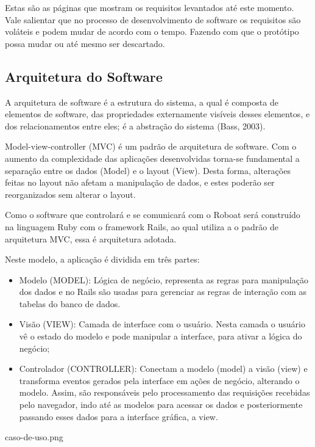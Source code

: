Estas são as páginas que mostram os requisitos levantados até este momento. Vale salientar que no processo de desenvolvimento de software os requisitos são voláteis e podem mudar de acordo com o tempo. Fazendo com que o protótipo possa mudar ou até mesmo ser descartado.

\subsection{Arquitetura do Software}


A arquitetura de software é a estrutura do sistema, a qual é composta de elementos de software, das propriedades externamente visíveis desses elementos, e dos relacionamentos entre eles; é a abstração do sistema (Bass, 2003).

Model-view-controller (MVC) é um padrão de arquitetura de software. Com o aumento da complexidade das aplicações desenvolvidas torna-se fundamental a separação entre os dados (Model) e o layout (View). Desta forma, alterações feitas no layout não afetam a manipulação de dados, e estes poderão ser reorganizados sem alterar o layout. 

Como o software que controlará e se comunicará com o Roboat será construído na linguagem Ruby com o framework Rails, ao qual utiliza a o padrão de arquitetura MVC, essa é arquitetura adotada.

Neste modelo, a aplicação é dividida em três partes:

\begin{itemize}
    \item Modelo (MODEL): Lógica de negócio, representa as regras para manipulação dos dados e no Rails são usadas para gerenciar as regras de interação com as tabelas do banco de dados.

    \item Visão (VIEW): Camada de interface com o usuário. Nesta camada o usuário vê o estado do modelo e pode manipular a interface, para ativar a lógica do negócio;

    \item Controlador (CONTROLLER): Conectam a modelo (model) a visão (view) e transforma eventos gerados pela interface em ações de negócio, alterando o modelo. Assim, são responsáveis pelo processamento das requisições recebidas pelo navegador, indo até as modelos para acessar os dados e posteriormente passando esses dados para a interface gráfica, a view.
\end{itemize}

caso-de-uso.png

